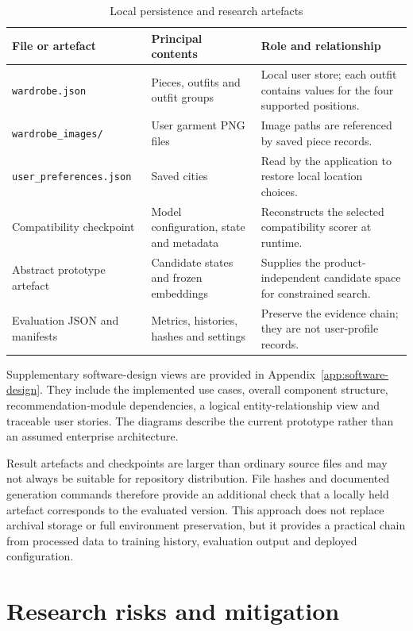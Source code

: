 \begin{table}[htbp]
  \centering
  \caption{Local persistence and research artefacts}
  \label{tab:local-persistence}
  \small
  \begin{tabularx}{\textwidth}{@{}p{}p{}X@{}}
    \toprule
    \textbf{File or artefact} & \textbf{Principal contents} & \textbf{Role and relationship} \\
    \midrule
    \texttt{wardrobe.json} & Pieces, outfits and outfit groups & Local user store; each outfit contains values for the four supported positions. \\
    \texttt{wardrobe\_images/} & User garment PNG files & Image paths are referenced by saved piece records. \\
    \texttt{user\_preferences.json} & Saved cities & Read by the application to restore local location choices. \\
    Compatibility checkpoint & Model configuration, state and metadata & Reconstructs the selected compatibility scorer at runtime. \\
    Abstract prototype artefact & Candidate states and frozen embeddings & Supplies the product-independent candidate space for constrained search. \\
    Evaluation JSON and manifests & Metrics, histories, hashes and settings & Preserve the evidence chain; they are not user-profile records. \\
    \bottomrule
  \end{tabularx}
\end{table}

Supplementary software-design views are provided in
Appendix~\ref{app:software-design}. They include the implemented use cases,
overall component structure, recommendation-module dependencies, a logical
entity-relationship view and traceable user stories. The diagrams describe the
current prototype rather than an assumed enterprise architecture.

Result artefacts and checkpoints are larger than ordinary source files and may
not always be suitable for repository distribution. File hashes and documented
generation commands therefore provide an additional check that a locally held
artefact corresponds to the evaluated version. This approach does not replace
archival storage or full environment preservation, but it provides a practical
chain from processed data to training history, evaluation output and deployed
configuration.

\section{Research risks and mitigation}

